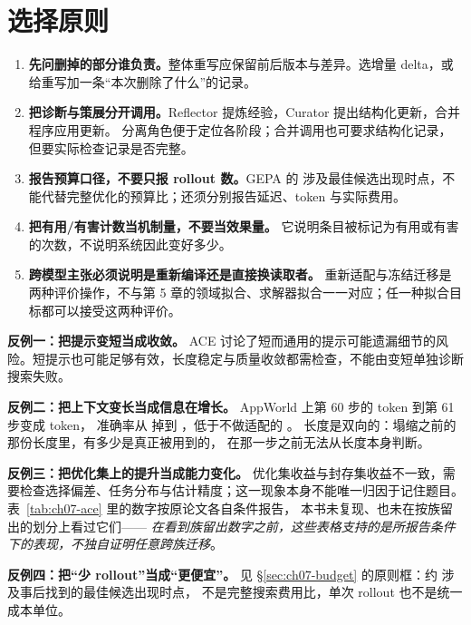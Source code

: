 \section{选择原则}
\label{sec:ch07-choice}

\begin{enumerate}
  \item \textbf{先问删掉的部分谁负责。}整体重写应保留前后版本与差异。选增量 delta，或给重写加一条``本次删除了什么''的记录。
  \item \textbf{把诊断与策展分开调用。}Reflector 提炼经验，Curator 提出结构化更新，合并程序应用更新。
        分离角色便于定位各阶段；合并调用也可要求结构化记录，但要实际检查记录是否完整。
  \item \textbf{报告预算口径，不要只报 rollout 数。}GEPA 的 
        涉及最佳候选出现时点，不能代替完整优化的预算比；还须分别报告延迟、token 与实际费用。
  \item \textbf{把有用/有害计数当机制量，不要当效果量。}
        它说明条目被标记为有用或有害的次数，不说明系统因此变好多少。
  \item \textbf{跨模型主张必须说明是重新编译还是直接换读取者。}
        重新适配与冻结迁移是两种评价操作，不与第 5 章的领域拟合、求解器拟合一一对应；任一种拟合目标都可以接受这两种评价。
\end{enumerate}

\begin{pitfallbox}
\textbf{反例一：把提示变短当成收敛。}
ACE 讨论了短而通用的提示可能遗漏细节的风险\cite{ace-2510}。短提示也可能足够有效，长度稳定与质量收敛都需检查，不能由变短单独诊断搜索失败。

\textbf{反例二：把上下文变长当成信息在增长。}
AppWorld 上第 60 步的  token 到第 61 步变成  token，
准确率从  掉到 ，低于不做适配的 \cite{ace-2510}。
长度是双向的：塌缩之前的那份长度里，有多少是真正被用到的，
在那一步之前无法从长度本身判断。

\textbf{反例三：把优化集上的提升当成能力变化。}
优化集收益与封存集收益不一致，需要检查选择偏差、任务分布与估计精度；这一现象本身不能唯一归因于记住题目。
表~\ref{tab:ch07-ace} 里的数字按原论文各自条件报告，
本书未复现、也未在按族留出的划分上看过它们——
\emph{在看到族留出数字之前，这些表格支持的是所报告条件下的表现，不独自证明任意跨族迁移}。

\textbf{反例四：把``少 rollout''当成``更便宜''。}
见 §\ref{sec:ch07-budget} 的原则框：约  涉及事后找到的最佳候选出现时点，
不是完整搜索费用比，单次 rollout 也不是统一成本单位。
\end{pitfallbox}

